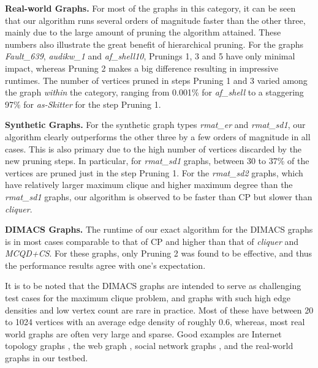 {\bf Real-world Graphs. }
For most of the graphs in this category, it can be seen that our algorithm runs several orders of magnitude faster than the other three, mainly due to the large amount of pruning the algorithm attained. These numbers also illustrate the great benefit of hierarchical pruning. 
For the graphs {\em Fault\_639}, {\em audikw\_1} and {\em af\_shell10}, 
Prunings 1, 3 and 5 have only minimal impact,
whereas Pruning 2 makes a big difference resulting in impressive runtimes. 
The number of vertices pruned in steps Pruning 1 and 3 varied among the 
graph {\em within} the
category, ranging from 0.001\% for {\it af\_shell} to a staggering 97\% for {\it as-Skitter} 
for the step Pruning 1. 




{\bf Synthetic Graphs. }
For the synthetic graph types {\it rmat\_er} and {\it rmat\_sd1}, our algorithm clearly outperforms 
the other three by a few orders of magnitude in all cases. 
This is also primary due to the high number of vertices discarded by the new pruning steps. 
In particular, for {\it rmat\_sd1} graphs, between 30 to 37\% of the vertices are pruned just in the step Pruning 1. 
For the {\it rmat\_sd2} graphs, which have relatively larger maximum clique and higher maximum degree than the {\it rmat\_sd1} graphs, our algorithm is observed to be faster than 
CP but slower than {\em cliquer}. 

{\bf DIMACS Graphs. }
The runtime of our exact algorithm for the DIMACS graphs is 
in most cases comparable to that of CP and higher than that of {\it cliquer}
and {\it MCQD+CS}.
For these graphs, only Pruning 2 was found to be effective, 
and thus the performance results agree with one's expectation. 

It is to be noted that the DIMACS graphs are intended to serve as challenging test cases for the maximum clique problem, and graphs with such high edge densities and low vertex count are rare in practice. 
Most of these have between 20 to 1024 vertices with an average edge density of roughly 0.6, 
whereas, most real world graphs are often very large and sparse. Good examples are Internet topology graphs \cite{Faloutsos:1999:PRI:316188.316229}, the web graph \cite{kumar:extracting}, social network graphs \cite{Domingos:2001:MNV:502512.502525}, and the real-world graphs in our testbed. 








